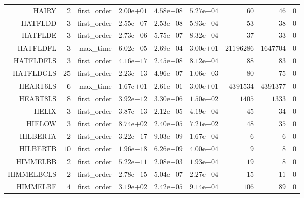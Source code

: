 \begin{longtable}{rrrrrrrrr}
HAIRY & \(     2\) & first\_order & \( 2.00\)e\(+01\) & \( 4.58\)e\(-08\) & \( 5.27\)e\(-04\) & \(    60\) & \(    46\) & \(     0\) \\
HATFLDD & \(     3\) & first\_order & \( 2.55\)e\(-07\) & \( 2.53\)e\(-08\) & \( 5.93\)e\(-04\) & \(    53\) & \(    38\) & \(     0\) \\
HATFLDE & \(     3\) & first\_order & \( 2.73\)e\(-06\) & \( 5.75\)e\(-07\) & \( 8.32\)e\(-04\) & \(    37\) & \(    33\) & \(     0\) \\
HATFLDFL & \(     3\) & max\_time & \( 6.02\)e\(-05\) & \( 2.69\)e\(-04\) & \( 3.00\)e\(+01\) & \(21196286\) & \(1647704\) & \(     0\) \\
HATFLDFLS & \(     3\) & first\_order & \( 4.16\)e\(-17\) & \( 2.45\)e\(-08\) & \( 8.12\)e\(-04\) & \(    88\) & \(    83\) & \(     0\) \\
HATFLDGLS & \(    25\) & first\_order & \( 2.23\)e\(-13\) & \( 4.96\)e\(-07\) & \( 1.06\)e\(-03\) & \(    80\) & \(    75\) & \(     0\) \\
HEART6LS & \(     6\) & max\_time & \( 1.67\)e\(+01\) & \( 2.61\)e\(-01\) & \( 3.00\)e\(+01\) & \(4391534\) & \(4391377\) & \(     0\) \\
HEART8LS & \(     8\) & first\_order & \( 3.92\)e\(-12\) & \( 3.30\)e\(-06\) & \( 1.50\)e\(-02\) & \(  1405\) & \(  1333\) & \(     0\) \\
HELIX & \(     3\) & first\_order & \( 3.87\)e\(-13\) & \( 2.12\)e\(-05\) & \( 4.19\)e\(-04\) & \(    45\) & \(    34\) & \(     0\) \\
HIELOW & \(     3\) & first\_order & \( 8.74\)e\(+02\) & \( 2.40\)e\(-05\) & \( 7.21\)e\(-02\) & \(    48\) & \(    35\) & \(     0\) \\
HILBERTA & \(     2\) & first\_order & \( 3.22\)e\(-17\) & \( 9.03\)e\(-09\) & \( 1.67\)e\(-04\) & \(     6\) & \(     6\) & \(     0\) \\
HILBERTB & \(    10\) & first\_order & \( 1.96\)e\(-18\) & \( 6.26\)e\(-09\) & \( 4.00\)e\(-04\) & \(     9\) & \(     8\) & \(     0\) \\
HIMMELBB & \(     2\) & first\_order & \( 5.22\)e\(-11\) & \( 2.08\)e\(-03\) & \( 1.93\)e\(-04\) & \(    19\) & \(     8\) & \(     0\) \\
HIMMELBCLS & \(     2\) & first\_order & \( 2.78\)e\(-15\) & \( 5.04\)e\(-07\) & \( 2.27\)e\(-04\) & \(    15\) & \(    11\) & \(     0\) \\
HIMMELBF & \(     4\) & first\_order & \( 3.19\)e\(+02\) & \( 2.42\)e\(-05\) & \( 9.14\)e\(-04\) & \(   106\) & \(    89\) & \(     0\) \\

\end{longtable}
